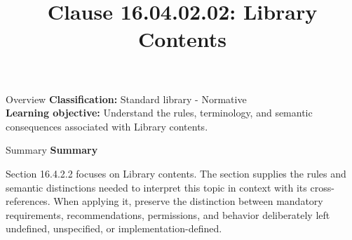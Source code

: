 \documentclass[10pt,letterpaper]{article}
\title{Clause 16.04.02.02: Library Contents}
\author{}
\date{}
\begin{document}
\maketitle
\begin{CornellOverviewBox}{Overview}
\textbf{Classification:} Standard library - Normative\\[2pt]
\textbf{Learning objective:} Understand the rules, terminology, and semantic consequences associated with Library contents.
\end{CornellOverviewBox}\begin{CornellSummaryBox}{Summary}
{\sffamily\bfseries\color{Accent} Summary}\par\vspace{3pt}Section 16.4.2.2 focuses on Library contents. The section supplies the rules and semantic distinctions needed to interpret this topic in context with its cross-references. When applying it, preserve the distinction between mandatory requirements, recommendations, permissions, and behavior deliberately left undefined, unspecified, or implementation-defined.
\end{CornellSummaryBox}
\end{document}
